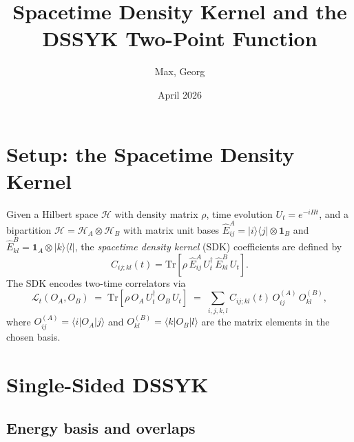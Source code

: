 \documentclass[12pt]{article}
\title{Spacetime Density Kernel and the DSSYK Two-Point Function}
\author{Max, Georg}
\date{April 2026}
\renewcommand{\tr}{\mathrm{Tr}}
\begin{document}
\maketitle

\section{Setup: the Spacetime Density Kernel}

Given a Hilbert space $\mathcal{H}$ with density matrix $\rho$, time evolution $U_t = e^{-iHt}$,
and a bipartition $\mathcal{H} = \mathcal{H}_A \otimes \mathcal{H}_B$ with matrix unit bases
$\hat{E}^A_{ij} = |i\rangle\langle j| \otimes \mathbf{1}_B$ and
$\hat{E}^B_{kl} = \mathbf{1}_A \otimes |k\rangle\langle l|$,
the \emph{spacetime density kernel} (SDK) coefficients are defined by
\begin{equation}
    C_{ij;kl}(t) = \tr\!\left[\rho\,\hat{E}^A_{ij}\,U_t^\dagger\,\hat{E}^B_{kl}\,U_t\right].
    \label{eq:SDK_def}
\end{equation}
The SDK encodes two-time correlators via
\begin{equation}
    \mathcal{L}_t(O_A, O_B)
    \;=\; \tr\!\left[\rho\,O_A\,U_t^\dagger\,O_B\,U_t\right]
    \;=\; \sum_{i,j,k,l} C_{ij;kl}(t)\,O^{(A)}_{ij}\,O^{(B)}_{kl},
    \label{eq:correlator_from_SDK}
\end{equation}
where $O^{(A)}_{ij} = \langle i|O_A|j\rangle$ and $O^{(B)}_{kl} = \langle k|O_B|l\rangle$
are the matrix elements in the chosen basis.

\section{Single-Sided DSSYK}

\subsection{Energy basis and overlaps}
\end{document}
